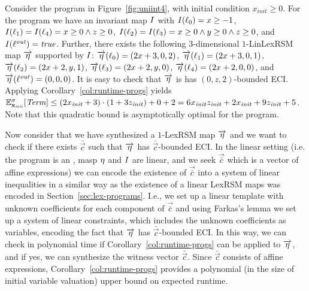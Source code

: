 \begin{example}
Consider the program in Figure~\ref{fig:uniint4}, with initial condition 
$x_{\mathit{init}}\geq 0$. For the program we have an 
invariant map $I$ with $I(\ell_0)=x\geq -1$, $I(\ell_1)=I(\ell_4) = 
x\geq 0 
\wedge z\geq 0$, $I(\ell_2)=I(\ell_3)= x\geq 0 \wedge y \geq 0
\wedge z\geq 0$, and $I(\ell^{\mathit{out}})=\mathit{true}$. Further, there exists 
the following 
$3$-dimensional 
$1$-LinLexRSM map $\overrightarrow{\eta}$ supported by $I$: 
$\overrightarrow{\eta}(\ell_0)=(2x+3,0,2)$, 
$\overrightarrow{\eta}(\ell_1)=(2x+3,0,1)$, 
$\overrightarrow{\eta}(\ell_2)=(2x+2,y,1)$, 
$\overrightarrow{\eta}(\ell_3)=(2x+2,y,0)$, 
$\overrightarrow{\eta}(\ell_4)=(2x+2,0,0)$, and 
$\overrightarrow{\eta}(\ell^{\mathit{out}})=(0,0,0)$. It is 
easy to check that $\overrightarrow{\eta}$ is has $(0,z,2)$-bounded ECI. 
Applying 
Corollary~\ref{col:runtime-progs} yields $\mathbb{E}^{\sigma}_{\mathbf{x}_{\mathit{init}}}[\mathit{Term}]\leq 
(2x_{\mathit{init}} + 
3)\cdot(1+3z_{\mathit{init}})+0+2= 6x_{\mathit{init}}z_{\mathit{init}} + 
2x_{\mathit{init}} + 9z_{\mathit{init}}+5$. Note that this quadratic bound is 
asymptotically optimal for the program.
\end{example}

\begin{remark}\label{rem:poly}
Now consider that we have synthesized a $1$-LexRSM map $\overrightarrow{\eta}$ 
and we want 
to check if there exists $\bar{\vec{c}}$ such that $\overrightarrow{\eta}$ has 
$\bar{\vec{c}}$-bounded ECI. In the linear setting (i.e. the program is an 
\APP{}, masp $\eta$ and $I$ are linear, and we seek $\vec{\bar{c}}$ which is 
a vector of affine expressions) we can encode the existence of $\vec{\bar{c}}$ 
into a system of linear inequalities in a similar way as the existence of a 
linear LexRSM maps was encoded in Section~\ref{sec:lex-programs}. I.e., we 
set up a linear template with unknown coefficients for each component of 
$\vec{\bar{c}}$ and using Farkas's lemma we set up a system of linear 
constraints, which includes the unknown coefficients as variables, encoding the 
fact that $\overrightarrow{\eta}$ has $\bar{\vec{c}}$-bounded ECI. In this way, 
we can check in polynomial time if 
Corollary~\ref{col:runtime-progs} can be applied to $\overrightarrow{\eta}$, 
and if yes, 
we can synthesize the witness vector $\bar{\vec{c}}$. Since $\bar{\vec{c}}$ 
consists of affine expressions, Corollary~\ref{col:runtime-progs} provides a 
polynomial (in the size of 
initial variable valuation) upper bound on expected runtime.
\end{remark}


